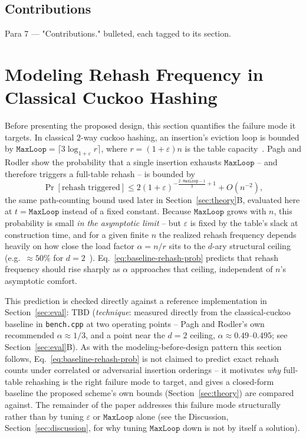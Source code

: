 \documentclass[conference]{IEEEtran}
\begin{document}
	\subsection{Contributions}
	Para 7 — "Contributions."
	bulleted, each tagged to its section.
	
	\section{Modeling Rehash Frequency in Classical Cuckoo Hashing}
	\label{sec:modeling}
	
	Before presenting the proposed design, this section quantifies the
	failure mode it targets. In classical $2$-way cuckoo hashing, an
	insertion's eviction loop is bounded by
	$\mathtt{MaxLoop} = \lceil 3\log_{1+\varepsilon} r \rceil$, where
	$r=(1+\varepsilon)n$ is the table capacity~\cite{pagh2004cuckoo}. Pagh and
	Rodler show the probability that a single insertion exhausts
	$\mathtt{MaxLoop}$ -- and therefore triggers a full-table rehash -- is
	bounded by
	\begin{equation}
		\Pr[\text{rehash triggered}] \le 2(1+\varepsilon)^{-\frac{2\cdot\mathtt{MaxLoop}-1}{3}+1} + O(n^{-2}),
		\label{eq:baseline-rehash-prob}
	\end{equation}
	the same path-counting bound used later in
	Section~\ref{sec:theory}B, evaluated here at $t=\mathtt{MaxLoop}$ instead
	of a fixed constant. Because $\mathtt{MaxLoop}$ grows with $n$, this
	probability is small \emph{in the asymptotic limit} -- but $\varepsilon$
	is fixed by the table's slack at construction time, and for a given
	finite $n$ the realized rehash frequency depends heavily on how close
	the load factor $\alpha=n/r$ sits to the $d$-ary structural ceiling
	(e.g.\ $\approx 50\%$ for $d=2$~\cite{pagh2004cuckoo}). Eq.~\ref{eq:baseline-rehash-prob}
	predicts that rehash frequency should rise sharply as $\alpha$
	approaches that ceiling, independent of $n$'s asymptotic comfort.
	
	This prediction is checked directly against a reference implementation
	in Section~\ref{sec:eval}: TBD (\emph{technique}: measured directly from
	the classical-cuckoo baseline in \texttt{bench.cpp} at two operating
	points -- Pagh and Rodler's own recommended $\alpha\!\approx\!1/3$, and
	a point near the $d{=}2$ ceiling, $\alpha\!\approx\!0.49$--$0.495$;
	see Section~\ref{sec:eval}B). As with the modeling-before-design pattern
	this section follows, Eq.~\ref{eq:baseline-rehash-prob} is not claimed
	to predict exact rehash counts under correlated or adversarial
	insertion orderings -- it motivates \emph{why} full-table rehashing is
	the right failure mode to target, and gives a closed-form baseline the
	proposed scheme's own bounds (Section~\ref{sec:theory}) are compared
	against. The remainder of the paper addresses this failure mode
	structurally rather than by tuning $\varepsilon$ or $\mathtt{MaxLoop}$
	alone (see the Discussion, Section~\ref{sec:discussion}, for why tuning
	$\mathtt{MaxLoop}$ down is not by itself a solution).
	
\end{document}
